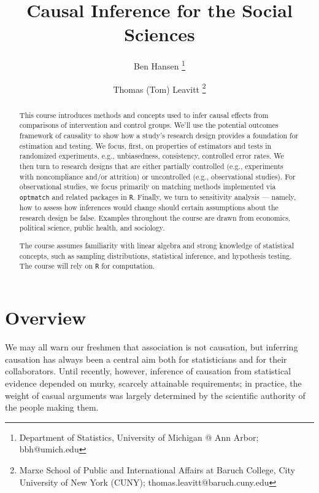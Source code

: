 \documentclass[12pt]{article}
\title{Causal Inference for the Social Sciences}
\author{Ben Hansen \thanks{Department of Statistics, University of Michigan @ Ann Arbor; \mbox{bbh@umich.edu}} \and
    Thomas (Tom) Leavitt \thanks{Marxe School of Public and International Affairs at Baruch College, City University of New York (CUNY); \mbox{thomas.leavitt@baruch.cuny.edu}} 
}
\begin{document}
\pagestyle{myfancy}

\maketitle
\begin{abstract}
\noindent This course introduces methods and concepts used to infer causal effects from comparisons of intervention and control groups. We'll use the potential outcomes framework of causality to show how a study's research design provides a foundation for estimation and testing. We focus, first, on properties of estimators and tests in randomized experiments, e.g., unbiasedness, consistency, controlled error rates. We then turn to research designs that are either partially controlled (e.g., experiments with noncompliance and/or attrition) or uncontrolled (e.g., observational studies). For observational studies, we focus primarily on matching methods implemented via \texttt{optmatch} and related packages in \texttt{R}. Finally, we turn to sensitivity analysis --- namely, how to assess how inferences would change should certain assumptions about the research design be false. Examples throughout the course are drawn from economics, political science, public health, and sociology.

The course assumes familiarity with linear algebra and strong knowledge of statistical concepts, such as sampling distributions, statistical inference, and hypothesis testing. The course will rely on \texttt{R} for computation.

\end{abstract}




\clearpage



\section*{Overview}

We may all warn our freshmen that association is not causation, but inferring causation has always been a central aim both for statisticians and for their collaborators. Until recently, however, inference of causation from statistical evidence depended on murky, scarcely attainable requirements; in practice, the weight of casual arguments was largely determined by the scientific authority of the people making them.
\end{document}

